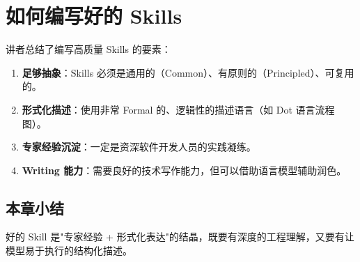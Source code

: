 \section{如何编写好的 Skills}

讲者总结了编写高质量 Skills 的要素：

\begin{enumerate}
    \item \textbf{足够抽象}：Skills 必须是通用的（Common）、有原则的（Principled）、可复用的。
    \item \textbf{形式化描述}：使用非常 Formal 的、逻辑性的描述语言（如 Dot 语言流程图）。
    \item \textbf{专家经验沉淀}：一定是资深软件开发人员的实践凝练。
    \item \textbf{Writing 能力}：需要良好的技术写作能力，但可以借助语言模型辅助润色。
\end{enumerate}

\subsection{本章小结}

好的 Skill 是"专家经验 + 形式化表达"的结晶，既要有深度的工程理解，又要有让模型易于执行的结构化描述。


